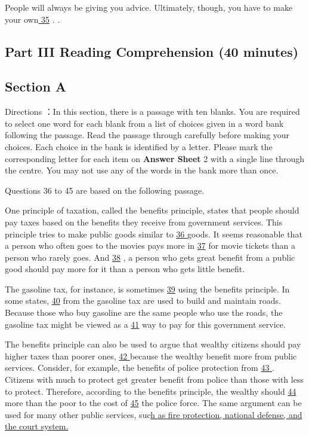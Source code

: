 \documentclass[UTF8,11pt]{ctexart}
\begin{document}
People will always be giving you advice. Ultimately, though, you have to make your own\uline{ 35} . .


\subsection*{Part III Reading Comprehension (40 minutes)}


\subsection*{\textbf{Section A}}


Directions ：In this section, there is a passage with ten blanks. You are required to select one word for each blank from a list of choices given in a word bank following the passage. Read the passage through carefully before making your choices. Each choice in the bank is identified by a letter. Please mark the corresponding letter for each item on\textbf{ Answer Sheet} 2 with a single line through the centre. You may not use any of the words in the bank more than once.


Questions 36 to 45 are based on the following passage.


One principle of taxation, called the benefits principle, states that people should pay taxes based on the benefits they receive from government services. This principle tries to make public goods similar to \uline{36 }goods. It seems reasonable that a person who often goes to the movies pays more in \uline{37} for movie tickets than a person who rarely goes. And \uline{38} , a person who gets great benefit from a public good should pay more for it than a person who gets little benefit.


The gasoline tax, for instance, is sometimes \uline{39} using the benefits principle. In some states, \uline{40} from the gasoline tax are used to build and maintain roads. Because those who buy gasoline are the same people who use the roads, the gasoline tax might be viewed as a \uline{41} way to pay for this government service.


The benefits principle can also be used to argue that wealthy citizens should pay higher taxes than poorer ones, \uline{42 }because the wealthy benefit more from public services. Consider, for example, the benefits of police protection from \uline{43 }. Citizens with much to protect get greater benefit from police than those with less to protect. Therefore, according to the benefits principle, the wealthy should \uline{44} more than the poor to the cost of \uline{45} the police force. The same argument can be used for many other public services, suc\uline{h as fire protection, national defense, and the court system.}
\end{document}
